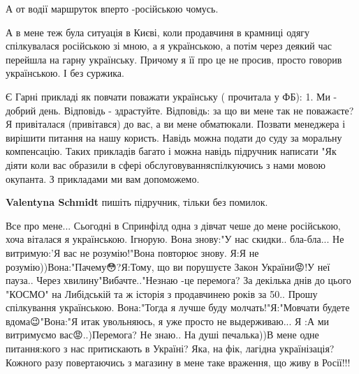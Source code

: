 \begin{itemize}
А от водії маршруток вперто -російською чомусь.

 

А в мене теж була ситуація в Києві, коли продавчиня в крамниці одягу
спілкувалася російською зі мною, а я українською, а потім через деякий час
перейшла на гарну українську. Причому я її про це не просив, просто говорив
українською. \Smiley[1.0][yellow] І без суржика.


 

Є Гарні прикладі як повчати поважати українську ( прочитала у ФБ): 1. Ми -
добрий день. Відповідь - здрастуйте. Відповідь: за що ви мене так не поважаєте?
Я привіталася (привітався) до вас, а ви мене обматюкали. Позвати менеджера і
вирішити питання на нашу користь. Навідь можна подати до суду за моральну
компенсацію.  Таких прикладів багато і можна навідь підручник написати "Як
діяти коли вас образили в сфері обслуговуванняспілкуючись з нами мовою
окупанта. З прикладами ми вам допоможемо.

\begin{itemize}
 
\textbf{Valentyna Schmidt} пишіть підручник, тільки без помилок.
\end{itemize}

 

Все про мене... Сьогодні в Спринфілд одна з дівчат чеше до мене російською, хоча
віталася я українською. Ігнорую. Вона знову:"У нас скидки.. бла-бла... Не
витримую:'Я вас не розумію!"Вона повторює знову. Я:Я не
розумію))Вона:"Пачему😳?Я:Тому, що ви порушуєте Закон України😡!У неї
пауза.. Через хвилину"Вибачте.."Незнаю -це перемога? За декілька днів до цього
"КОСМО" на Либідській та ж історія з продавчинею років за 50.. Прошу спілкування
українською. Вона:"Тогда я лучше буду молчать!"Я:"Мовчати будете вдома😉"Вона:"Я
итак увольняюсь, я уже просто не выдерживаю... Я :А ми витримуємо
вас😡..)Перемога? Не знаю.. На душі печалька))В мене одне питання:кого з нас
притискають в Україні? Яка, на фік, лагідна українізація? Кожного разу
повертаючись з магазину в мене таке враження, що живу в Росії!!!



\end{itemize}
